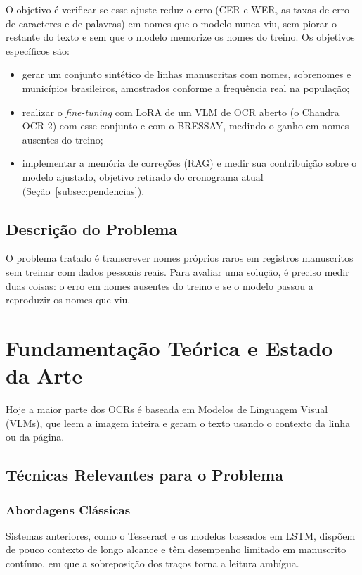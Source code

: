 \documentclass[12pt,a4paper]{article}
\begin{document}
O objetivo é verificar se esse ajuste reduz o erro (CER e WER, as taxas de erro de caracteres e de palavras) em nomes que o modelo nunca viu, sem piorar o restante do texto e sem que o modelo memorize os nomes do treino. Os objetivos específicos são:
\begin{itemize}
    \item gerar um conjunto sintético de linhas manuscritas com nomes, sobrenomes e municípios brasileiros, amostrados conforme a frequência real na população;
    \item realizar o \emph{fine-tuning} com LoRA de um VLM de OCR aberto (o Chandra OCR 2) com esse conjunto e com o BRESSAY, medindo o ganho em nomes ausentes do treino;
    \item implementar a memória de correções (RAG) e medir sua contribuição sobre o modelo ajustado, objetivo retirado do cronograma atual (Seção~\ref{subsec:pendencias}).
\end{itemize}

\subsection{Descrição do Problema}

O problema tratado é transcrever nomes próprios raros em registros manuscritos sem treinar com dados pessoais reais. Para avaliar uma solução, é preciso medir duas coisas: o erro em nomes ausentes do treino e se o modelo passou a reproduzir os nomes que viu.

\section{Fundamentação Teórica e Estado da Arte}
\label{sec:fundamentacao}

Hoje a maior parte dos OCRs é baseada em Modelos de Linguagem Visual (VLMs), que leem a imagem inteira e geram o texto usando o contexto da linha ou da página.

\subsection{Técnicas Relevantes para o Problema}

\subsubsection{Abordagens Clássicas}
Sistemas anteriores, como o Tesseract e os modelos baseados em LSTM, dispõem de pouco contexto de longo alcance e têm desempenho limitado em manuscrito contínuo, em que a sobreposição dos traços torna a leitura ambígua.
\end{document}

